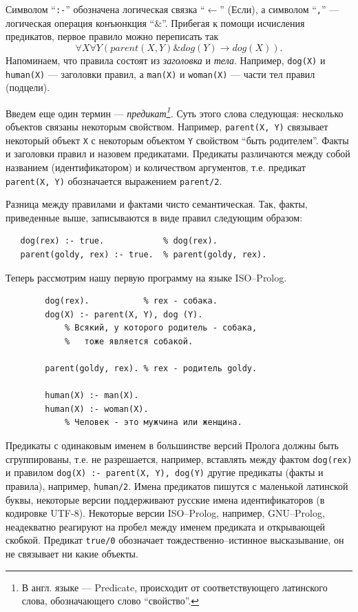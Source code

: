 \documentclass[12pt, openany, twoside]{book} %
\begin{document}
\noindent Символом ``{\tt :-}'' обозначена логическая связка ``$\leftarrow$'' (Если), а символом ``{\tt ,}'' --- логическая операция конъюнкция ``$\&$''. Прибегая к помощи исчисления предикатов, первое правило можно переписать так
$$
    \forall X \forall Y (parent(X, Y) \& dog(Y) \to dog(X)).
$$
Напоминаем, что правила состоят из {\em заголовка} и {\em тела}. Например, {\tt dog(X)} и {\tt human(X)} --- заголовки правил, а {\tt man(X)} и {\tt woman(X)} --- части тел правил (подцели).

Введем еще один термин --- {\em предикат\footnote{В англ. языке --- Predicate, происходит от соответствующего латинского слова, обозначающего слово ``свойство''.}.} Суть этого слова следующая: несколько объектов связаны некоторым свойством. Например, {\tt parent(X, Y)} связывает некоторый объект {\tt X} с некоторым объектом {\tt Y} свойством ``быть родителем''. Факты и заголовки правил и назовем предикатами. Предикаты различаются между собой названием (идентификатором) и количеством аргументов, т.е. предикат {\tt parent(X, Y)} обозначается выражением {\tt parent/2}.

Разница между правилами и фактами чисто семантическая. Так, факты, приведенные выше, записываются в виде правил следующим образом:
{\tt\begin{verbatim}
   dog(rex) :- true.            % dog(rex).
   parent(goldy, rex) :- true.  % parent(goldy, rex).
\end{verbatim}}

Теперь рассмотрим нашу первую программу на языке ISO--Prolog.
{\tt\begin{verbatim}
        dog(rex).           % rex - собака.
        dog(X) :- parent(X, Y), dog (Y).
            % Всякий, у которого родитель - собака,
            %   тоже является собакой.

        parent(goldy, rex). % rex - родитель goldy.

        human(Х) :- man(Х).
        human(Х) :- woman(Х).
            % Человек - это мужчина или женщина.
\end{verbatim}}
Предикаты с одинаковым именем в большинстве версий Пролога должны быть сгруппированы, т.е. не разрешается, например, вставлять между фактом {\tt dog(rex)} и правилом {\tt dog(X) :- parent(X, Y), dog(Y)} другие предикаты (факты и правила), например, {\tt human/2}. Имена предикатов пишутся с маленькой латинской буквы, некоторые версии поддерживают русские имена идентификаторов (в кодировке UTF-8). Некоторые версии ISO--Prolog, например, GNU--Prolog, неадекватно реагируют на пробел между именем предиката и открывающей скобкой.  Предикат {\tt true/0} обозначает тождественно--истинное высказывание, он не связывает ни какие объекты.
\end{document}
